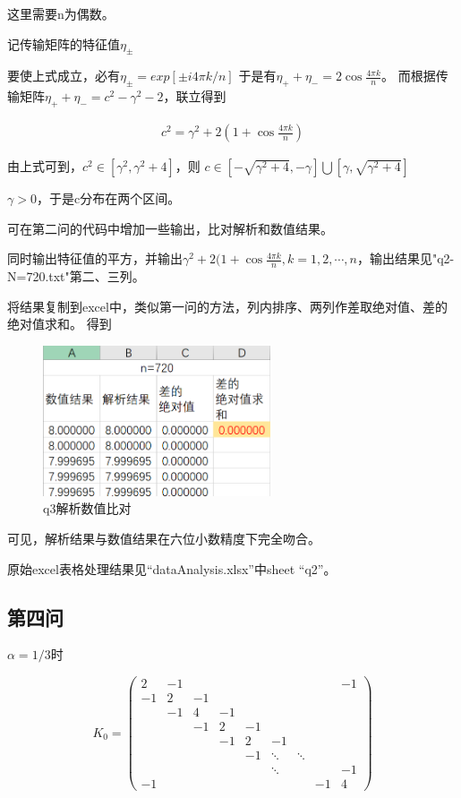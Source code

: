 \documentclass[10pt, a4paper]{article}
\begin{document}
    这里需要n为偶数。

    记传输矩阵的特征值$\eta_\pm $

    要使上式成立，必有$\eta_\pm=exp[\pm i 4\pi k/n]$
    于是有$\eta_++\eta_-=2\cos\frac{4\pi k}{n}$。
    而根据传输矩阵$\eta_++\eta_-=c^2-\gamma^2-2$，联立得到

    \begin{align}
        c^2=\gamma^2+2(1+\cos\frac{4\pi k}{n})
    \end{align}

    由上式可到，$c^2\in[\gamma^2,{\gamma^2+4}]$，则
    $c\in [-\sqrt{\gamma^2+4},-\gamma]\bigcup[\gamma,\sqrt{\gamma^2+4}]$

    $\gamma>0$，于是c分布在两个区间。

    可在第二问的代码中增加一些输出，比对解析和数值结果。

    同时输出特征值的平方，并输出$\gamma^2+2(1+\cos\frac{4\pi k}{n},k=1,2,\cdots,n$，输出结果见"q2-N=720.txt"第二、三列。

    将结果复制到excel中，类似第一问的方法，列内排序、两列作差取绝对值、差的绝对值求和。
    得到

    \begin{figure}[H]
        \centering
        \includegraphics[width=0.6\textwidth]{q3解析数值比对.png}
        \caption{q3解析数值比对}\label{fig:q3解析数值比对}
    \end{figure}

    可见，解析结果与数值结果在六位小数精度下完全吻合。

    原始excel表格处理结果见“dataAnalysis.xlsx”中sheet “q2”。
    \subsection{第四问}

    $\alpha=1/3$时

    \[
        K_0=\begin{pmatrix}
            2&-1& & & & & & &-1\\
            -1&2&-1& & & & & &\\
             &-1&4&-1& & & & & \\
             & &-1&2& -1& & & &\\
             & & &-1&2&-1& & &\\
             &&&&-1 & \ddots&\ddots& \\
             &&&&& \ddots& && -1\\
            -1& & & & & & &-1&4 
        \end{pmatrix}
    \]
\end{document}
